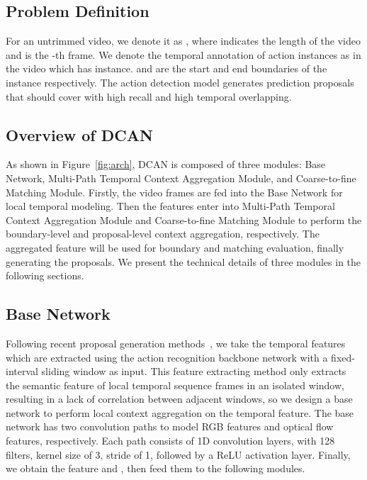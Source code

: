 \documentclass[letterpaper]{article} \usepackage{aaai22}  \usepackage{times}  \usepackage{helvet}  \usepackage{courier}  \usepackage[hyphens]{url}  \usepackage{graphicx} \urlstyle{rm} \def\UrlFont{\rm}  \usepackage{natbib}  \usepackage{caption} \DeclareCaptionStyle{ruled}{labelfont=normalfont,labelsep=colon,strut=off} \frenchspacing  \setlength{\pdfpagewidth}{8.5in}  \setlength{\pdfpageheight}{11in}  \usepackage{algorithm}
\begin{document}
\subsection{Problem Definition}
For an untrimmed video, we denote it as , where  indicates the length of the video and   is the -th frame. We denote the temporal annotation of action instances as  in the video  which has   instance.  and  are the start and end boundaries of the instance  respectively. The action detection model generates prediction proposals that should cover  with high recall and high temporal overlapping.

\subsection{Overview of DCAN}
As shown in Figure~\ref{fig:arch}, DCAN is composed of three modules: Base Network, Multi-Path Temporal Context Aggregation Module, and Coarse-to-fine Matching Module. 
Firstly, the video frames are fed into the Base Network for local temporal modeling. 
Then the features enter into Multi-Path Temporal Context Aggregation Module and Coarse-to-fine Matching Module to perform the boundary-level and proposal-level context aggregation, respectively. 
The aggregated feature will be used for boundary and matching evaluation, finally generating the proposals. 
We present the technical details of three modules in the following sections.


\subsection{Base Network} 







Following recent proposal generation methods~\cite{bsn,bmn}, we take the temporal features which are extracted using the action recognition backbone network with a fixed-interval sliding window as input.
This feature extracting method only extracts the semantic feature of local temporal sequence frames in an isolated window, resulting in a lack of correlation between adjacent windows, so we design a base network to perform local context aggregation on the temporal feature.
The base network has two convolution paths to model RGB features and optical flow features, respectively.
Each path consists of  1D convolution layers, with 128 filters, kernel size of 3, stride of 1, followed by a ReLU activation layer.
Finally, we obtain the feature  and , then feed them to the following modules.
\end{document}

